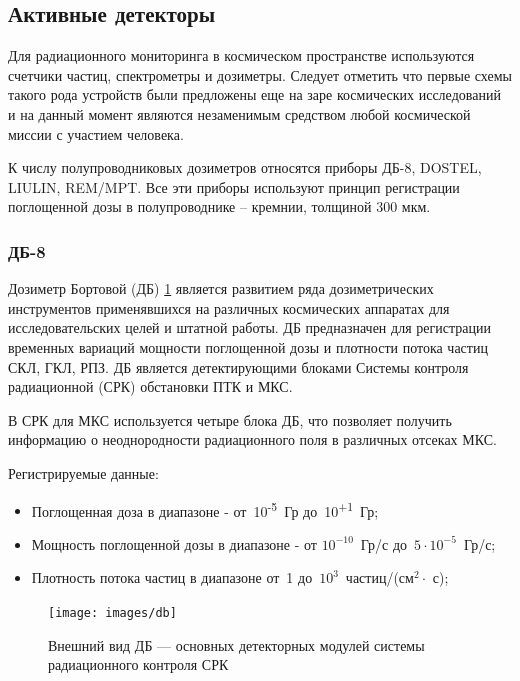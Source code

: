 \subsection{Активные детекторы} \label{subsect1_3_2}

Для радиационного мониторинга в космическом пространстве используются счетчики частиц, спектрометры и дозиметры. Следует отметить что первые схемы такого рода устройств были предложены еще на заре космических исследований \cite{Markelov1982,Markelov1978} и на данный момент являются незаменимым средством любой космической миссии с участием человека.

К числу полупроводниковых дозиметров относятся приборы ДБ-8, DOSTEL, LIULIN, REM/MPT. Все эти приборы используют принцип регистрации поглощенной дозы в полупроводнике – кремнии, толщиной 300 мкм.  

\subsubsection{ДБ-8}

Дозиметр Бортовой (ДБ) \ref{fig:db} является развитием ряда дозиметрических инструментов применявшихся на различных космических аппаратах для исследовательских целей и штатной работы. ДБ предназначен для регистрации временных вариаций мощности поглощенной дозы и плотности потока частиц СКЛ, ГКЛ, РПЗ. ДБ является детектирующими блоками Системы контроля радиационной (СРК) обстановки ПТК и МКС.

В СРК для МКС используется четыре блока ДБ, что позволяет получить информацию о неоднородности радиационного поля в различных отсеках МКС. 

Регистрируемые данные:
\begin{itemize}
	\item 
	Поглощенная доза в диапазоне - от~10\textsuperscript{-5}~Гр  до~10\textsuperscript{+1}~Гр;  
	\item  
	Мощность поглощенной дозы в диапазоне - от $10^{-10}$~Гр/с  до~$5\cdot10^{-5}$~Гр/с;
	\item  
	Плотность потока частиц в диапазоне от~1 до~$ 10^3 $~частиц/(см$^2\cdot$ с);    		
\end{itemize}



\begin{figure}
\centering
\texttt{[image: images/db]}
\caption{Внешний вид ДБ --- основных детекторных модулей системы радиационного контроля СРК}
\label{fig:db}
\end{figure}


